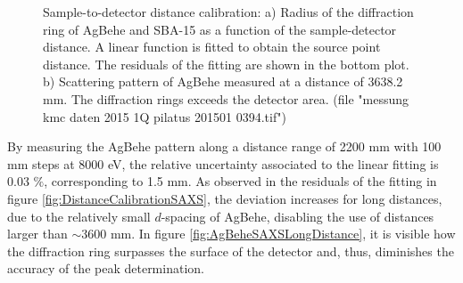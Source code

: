 \begin{figure}
	\centering
		\caption{Sample-to-detector distance calibration: a) Radius of the diffraction ring of AgBehe and SBA-15 as a function of the sample-detector distance. A linear function is fitted to obtain the source point distance. The residuals of the fitting are shown in the bottom plot. b) Scattering pattern of AgBehe measured at a distance of 3638.2 mm. The diffraction rings exceeds the detector area. (file "messung kmc daten 2015 1Q pilatus 201501 0394.tif")}
\end{figure}

By measuring the AgBehe pattern along a distance range of 2200 mm with 100 mm steps at 8000 eV, the relative uncertainty associated to the linear fitting is 0.03 $\%$, corresponding to 1.5 mm. As observed in the residuals of the fitting in figure \ref{fig:DistanceCalibrationSAXS}, the deviation increases for long distances, due to the relatively small $d$-spacing of AgBehe, disabling the use of distances larger than $\sim 3600$ mm. In figure \ref{fig:AgBeheSAXSLongDistance}, it is visible how the diffraction ring surpasses the surface of the detector and, thus, diminishes the accuracy of the peak determination.

